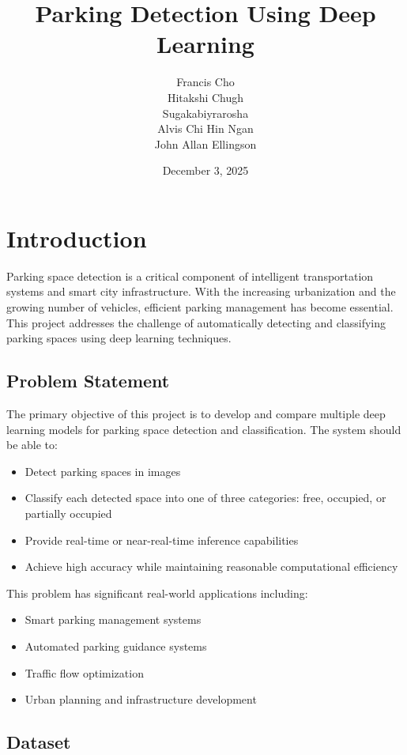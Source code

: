 \documentclass[12pt,a4paper]{article}
\title{Parking Detection Using Deep Learning}
\author{
    Francis Cho\\
    Hitakshi Chugh\\
    Sugakabiyrarosha\\
    Alvis Chi Hin Ngan\\
    John Allan Ellingson
}
\date{December 3, 2025}
\begin{document}
\maketitle

\newpage
\tableofcontents
\newpage
\listoffigures
\newpage
\listoftables

\newpage
\section{Introduction}

Parking space detection is a critical component of intelligent transportation systems and smart city infrastructure. With the increasing urbanization and the growing number of vehicles, efficient parking management has become essential. This project addresses the challenge of automatically detecting and classifying parking spaces using deep learning techniques.

\subsection{Problem Statement}

The primary objective of this project is to develop and compare multiple deep learning models for parking space detection and classification. The system should be able to:
\begin{itemize}
    \item Detect parking spaces in images
    \item Classify each detected space into one of three categories: free, occupied, or partially occupied
    \item Provide real-time or near-real-time inference capabilities
    \item Achieve high accuracy while maintaining reasonable computational efficiency
\end{itemize}

This problem has significant real-world applications including:
\begin{itemize}
    \item Smart parking management systems
    \item Automated parking guidance systems
    \item Traffic flow optimization
    \item Urban planning and infrastructure development
\end{itemize}

\subsection{Dataset}
\end{document}
